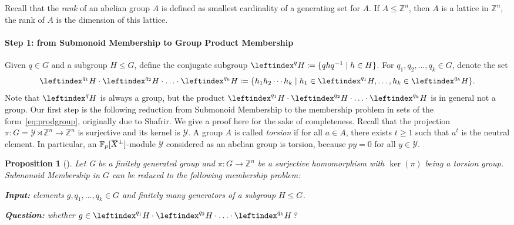 \documentclass[a4paper,UKenglish,cleveref, autoref, thm-restate]{lipics-v2021}
\newcommand{\Z}{\mathbb{Z}}
\newcommand{\F}{\mathbb{F}}
\newcommand{\mY}{\mathcal{Y}}
\newcommand{\oX}{\mkern 1.5mu\overline{\mkern-1.5mu X \mkern-1.5mu}\mkern 1.5mu}
\newtheorem{prop}[thrm]{Proposition}
\theoremstyle{definition}
\theoremstyle{definition}
\theoremstyle{definition}
\begin{document}
Recall that the \emph{rank} of an abelian group $A$ is defined as smallest cardinality of a generating set for $A$.
If $A \leq \Z^n$, then $A$ is a lattice in $\Z^n$, the rank of $A$ is the dimension of this lattice.

\paragraph*{Step 1: from Submonoid Membership to Group Product Membership}

Given $q \in G$ and a subgroup $H \leq G$, define the conjugate subgroup $\leftindex^{q}{H} \coloneqq \{qhq^{-1} \mid h \in H\}$.
For $q_1, q_2, \ldots, q_k \in G$, denote the set
\begin{equation}\label{eq:prodgroup}
\leftindex^{q_1}{H} \cdot \leftindex^{q_2}{H} \cdot \ldots \cdot \leftindex^{q_{k}}{H} \coloneqq \{h_1 h_2 \cdots h_k \mid h_1 \in \leftindex^{q_1}{H}, \ldots, h_k \in \leftindex^{q_{k}}{H}\}.
\end{equation}
Note that $\leftindex^{q}{H}$ is always a group, but the product $\leftindex^{q_1}{H} \cdot \leftindex^{q_2}{H} \cdot \ldots \cdot \leftindex^{q_{k}}{H}$ is in general not a group.
Our first step is the following reduction from Submonoid Membership to the membership problem in sets of the form~\eqref{eq:prodgroup}, originally due to Shafrir.
We give a proof here for the sake of completeness.
Recall that the projection $\pi \colon G = \mY \rtimes \Z^n \rightarrow \Z^n$ is surjective and its kernel is $\mY$.
A group $A$ is called \emph{torsion} if for all $a \in A$, there exists $t \geq 1$ such that $a^t$ is the neutral element.
In particular, an $\F_p[\oX^{\pm}]$-module $\mY$ considered as an abelian group is torsion, because $p y = 0$ for all $y \in \mY$.

\begin{prop}[{\cite[Theorem~4.3.3]{potthast2020submonoid}}]\label{prop:SMtoGP}
    Let G be a finitely generated group and $\pi \colon G \rightarrow \Z^n$ be a surjective homomorphism with $\ker(\pi)$ being a torsion group. Submonoid Membership in $G$ can be reduced to the following membership problem:
    
    \textbf{Input:} elements $g, q_1, \ldots, q_k \in G$ and finitely many generators of a subgroup $H \leq G$.
    
    \textbf{Question:} whether $g \in \leftindex^{q_1}{H} \cdot \leftindex^{q_2}{H} \cdot \ldots \cdot \leftindex^{q_{k}}{H}$?
\end{prop}
\end{document}
